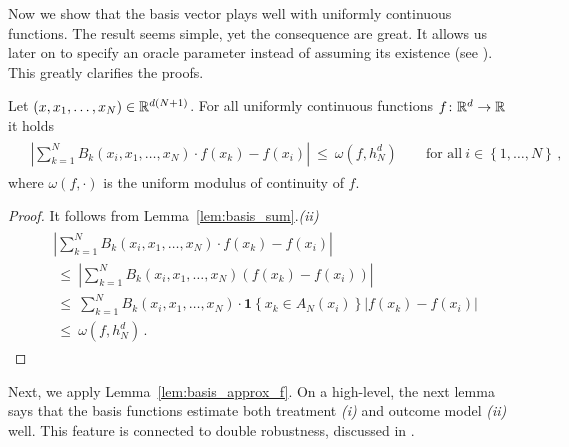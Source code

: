 %
Now we show that the basis vector plays well with uniformly continuous functions. The result seems simple, yet the consequence are great. It allows us later on to specify an oracle parameter instead of assuming its existence (see \cite[Assumption~1.6]{Wang2019}). This greatly clarifies the proofs.
\begin{lemma}
  \label{lem:basis_approx_f}
  Let $(x,x_1,\ldots,x_N)\in\mathbb{R}^{d(N+1)}$.
  For all uniformly continuous functions $f\colon \mathbb{R}^d\to \mathbb{R}$ it holds
 \begin{align*}
   \begin{split}
   &
   \left|
  \sum_{k=1}^{N}
    B_k(x_i,x_1,\ldots,x_N)\cdot 
    f(x_k)
    -
    f(x_i)
   \right|
   \ 
   \le
   \ 
   \omega
   \left(
    f,h_N^d
   \right)
   \qquad
   \text{for all}\ 
   i\in \left\{ 1,\ldots,N \right\}
   \,,
   \end{split}
 \end{align*}
 where $\omega(f,\cdot)$ is the uniform modulus of continuity of $f$. 
\end{lemma}
\begin{proof}
  It follows from Lemma~\ref{lem:basis_sum}.\textit{(ii)}
  \begin{align*}
   \begin{split}
   &
   \left|
  \sum_{k=1}^{N}
    B_k(x_i,x_1,\ldots,x_N)\cdot 
    f(x_k)
    -
    f(x_i)
   \right|
   \\
   &
   \ 
   \le
   \ 
   \left|
  \sum_{k=1}^{N}
    B_k(x_i,x_1,\ldots,x_N)
    \left(
    f(x_k)
    -
    f(x_i)
    \right)
   \right|
   \\
   &
   \ 
   \le
   \ 
  \sum_{k=1}^{N}
    B_k(x_i,x_1,\ldots,x_N)
    \cdot
    \mathbf{1}\left\{
      x_k\in A_N(x_i)
    \right\}
    \left|
    f(x_k)
    -
    f(x_i)
    \right|
   \\
   &
   \ 
   \le
   \ 
   \omega
   \left(
    f,h_N^d
   \right)
   \,.
   \end{split}
 \end{align*}
\end{proof}
Next, we apply  Lemma~\ref{lem:basis_approx_f}.
On a high-level, the next lemma says that the basis functions estimate both treatment \textit{(i)} and outcome model \textit{(ii)} well.
This feature is connected to double robustness, discussed in \cite{Zhao2017a}.

